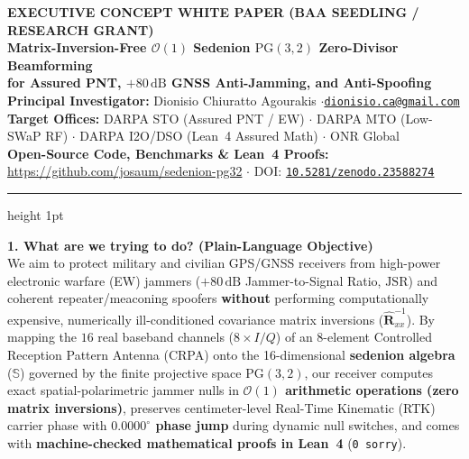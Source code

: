 \documentclass[10pt,a4paper]{article}
\newcommand{\Se}{\mathbb{S}}
\newcommand{\PG}{\mathrm{PG}}
\begin{document}
\begin{center}
{\large\textbf{EXECUTIVE CONCEPT WHITE PAPER (BAA SEEDLING / RESEARCH GRANT)}}\\[0.3em]
{\Large\textbf{Matrix-Inversion-Free $\mathcal{O}(1)$ Sedenion $\PG(3,2)$ Zero-Divisor Beamforming\\for Assured PNT, $+80\,\mathrm{dB}$ GNSS Anti-Jamming, and Anti-Spoofing}}\\[0.4em]
\textbf{Principal Investigator:} Dionisio Chiuratto Agourakis \quad$\cdot$\quad \href{mailto:dionisio.ca@gmail.com}{\texttt{dionisio.ca@gmail.com}}\\
\textbf{Target Offices:} DARPA STO (Assured PNT / EW) $\cdot$ DARPA MTO (Low-SWaP RF) $\cdot$ DARPA I2O/DSO (Lean~4 Assured Math) $\cdot$ ONR Global\\
\textbf{Open-Source Code, Benchmarks \& Lean~4 Proofs:} \url{https://github.com/josaum/sedenion-pg32} $\cdot$ DOI: \href{https://doi.org/10.5281/zenodo.23588274}{\texttt{10.5281/zenodo.23588274}}
\end{center}
\vspace{-0.4em}
\hrule height 1pt
\vspace{0.4em}

\textbf{1. What are we trying to do? (Plain-Language Objective)}\\
We aim to protect military and civilian GPS/GNSS receivers from high-power electronic warfare (EW) jammers ($+80\,\mathrm{dB}$ Jammer-to-Signal Ratio, $\mathrm{JSR}$) and coherent repeater/meaconing spoofers \textbf{without} performing computationally expensive, numerically ill-conditioned covariance matrix inversions ($\hat{\bm{R}}_{xx}^{-1}$). By mapping the $16$ real baseband channels ($8\times I/Q$) of an 8-element Controlled Reception Pattern Antenna (CRPA) onto the 16-dimensional \textbf{sedenion algebra} ($\Se$) governed by the finite projective space $\PG(3,2)$, our receiver computes exact spatial-polarimetric jammer nulls in \textbf{$\mathcal{O}(1)$ arithmetic operations (zero matrix inversions)}, preserves centimeter-level Real-Time Kinematic (RTK) carrier phase with \textbf{$0.0000^\circ$ phase jump} during dynamic null switches, and comes with \textbf{machine-checked mathematical proofs in Lean~4} (\texttt{0 sorry}).
\end{document}

